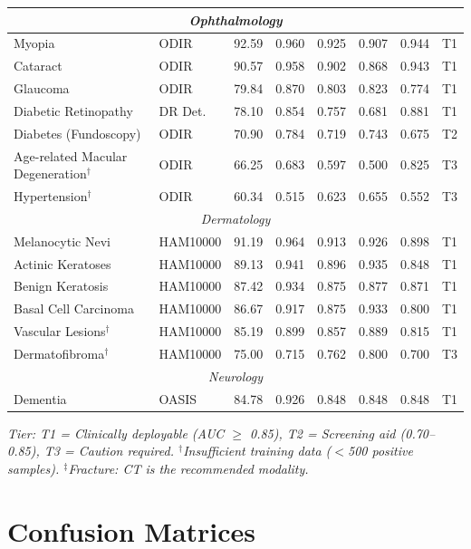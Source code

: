 \documentclass[12pt,a4paper]{report}
\begin{document}
\begin{longtable}{@{}llcccccc@{}}
\midrule
\multicolumn{8}{c}{\textit{Ophthalmology}} \\
\midrule
Myopia & ODIR & 92.59 & 0.960 & 0.925 & 0.907 & 0.944 & T1 \\
Cataract & ODIR & 90.57 & 0.958 & 0.902 & 0.868 & 0.943 & T1 \\
Glaucoma & ODIR & 79.84 & 0.870 & 0.803 & 0.823 & 0.774 & T1 \\
Diabetic Retinopathy & DR Det. & 78.10 & 0.854 & 0.757 & 0.681 & 0.881 & T1 \\
Diabetes (Fundoscopy) & ODIR & 70.90 & 0.784 & 0.719 & 0.743 & 0.675 & T2 \\
\makecell[l]{Age-related Macular\\Degeneration$^\dagger$} & ODIR & 66.25 & 0.683 & 0.597 & 0.500 & 0.825 & T3 \\
Hypertension$^\dagger$ & ODIR & 60.34 & 0.515 & 0.623 & 0.655 & 0.552 & T3 \\
\midrule
\multicolumn{8}{c}{\textit{Dermatology}} \\
\midrule
Melanocytic Nevi & HAM10000 & 91.19 & 0.964 & 0.913 & 0.926 & 0.898 & T1 \\
Actinic Keratoses & HAM10000 & 89.13 & 0.941 & 0.896 & 0.935 & 0.848 & T1 \\
Benign Keratosis & HAM10000 & 87.42 & 0.934 & 0.875 & 0.877 & 0.871 & T1 \\
Basal Cell Carcinoma & HAM10000 & 86.67 & 0.917 & 0.875 & 0.933 & 0.800 & T1 \\
Vascular Lesions$^\dagger$ & HAM10000 & 85.19 & 0.899 & 0.857 & 0.889 & 0.815 & T1 \\
Dermatofibroma$^\dagger$ & HAM10000 & 75.00 & 0.715 & 0.762 & 0.800 & 0.700 & T3 \\
\midrule
\multicolumn{8}{c}{\textit{Neurology}} \\
\midrule
Dementia & OASIS & 84.78 & 0.926 & 0.848 & 0.848 & 0.848 & T1 \\
\bottomrule
\end{longtable}
\endgroup

\noindent\footnotesize{\textit{Tier: T1 = Clinically deployable (AUC $\geq$ 0.85), T2 = Screening aid (0.70--0.85), T3 = Caution required. $^\dagger$Insufficient training data ($<$500 positive samples). $^\ddagger$Fracture: CT is the recommended modality.}}
\normalsize

\section{Confusion Matrices}
\end{document}
